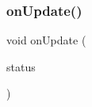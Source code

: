 \subsubsection{\texorpdfstring{on\+Update()}{onUpdate()}}
{\footnotesize\ttfamily void on\+Update (\begin{DoxyParamCaption}\item[{\hyperlink{classcom_1_1toast_1_1android_1_1gamebase_1_1launching_1_1data_1_1_launching_status}{Launching\+Status}}]{status }\end{DoxyParamCaption})}

